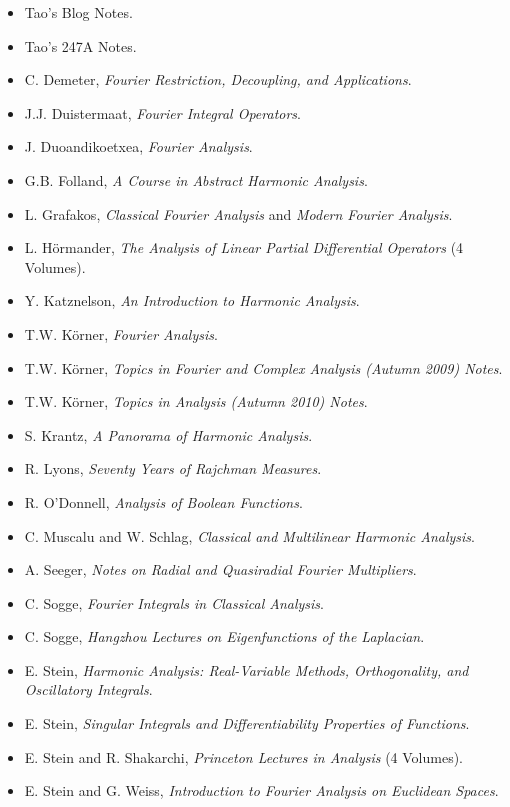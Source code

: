 \begin{itemize}
	\item Tao's Blog Notes.
	\item Tao's 247A Notes.
	\item C. Demeter, \emph{Fourier Restriction, Decoupling, and Applications}.
	\item J.J. Duistermaat, \emph{Fourier Integral Operators}.
	\item J. Duoandikoetxea, \emph{Fourier Analysis}.
	\item G.B. Folland, \emph{A Course in Abstract Harmonic Analysis}.
	\item L. Grafakos, \emph{Classical Fourier Analysis} and \emph{Modern Fourier Analysis}.
	\item L. H\"{o}rmander, \emph{The Analysis of Linear Partial Differential Operators} (4 Volumes).
	\item Y. Katznelson, \emph{An Introduction to Harmonic Analysis}.
	\item T.W. K\"{o}rner, \emph{Fourier Analysis}.
	\item T.W. K\"{o}rner, \emph{Topics in Fourier and Complex Analysis (Autumn 2009) Notes}.
	\item T.W. K\"{o}rner, \emph{Topics in Analysis (Autumn 2010) Notes}.
	\item S. Krantz, \emph{A Panorama of Harmonic Analysis}.
	\item R. Lyons, \emph{Seventy Years of Rajchman Measures}.
	\item R. O'Donnell, \emph{Analysis of Boolean Functions}.
	\item C. Muscalu and W. Schlag, \emph{Classical and Multilinear Harmonic Analysis}.
	\item A. Seeger, \emph{Notes on Radial and Quasiradial Fourier Multipliers}.
	\item C. Sogge, \emph{Fourier Integrals in Classical Analysis}.
	\item C. Sogge, \emph{Hangzhou Lectures on Eigenfunctions of the Laplacian}.
	\item E. Stein, \emph{Harmonic Analysis: Real-Variable Methods, Orthogonality, and Oscillatory Integrals}.
	\item E. Stein, \emph{Singular Integrals and Differentiability Properties of Functions}.
	\item E. Stein and R. Shakarchi, \emph{Princeton Lectures in Analysis} (4 Volumes).
	\item E. Stein and G. Weiss, \emph{Introduction to Fourier Analysis on Euclidean Spaces}.

\end{itemize}
